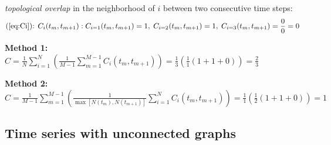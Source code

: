 \documentclass[12pt]{article}
\begin{document}
\emph{topological overlap} in the neighborhood of \(i\) between two consecutive time steps:
\[\text{(\ref{eq:Ci}): } C_{i} (t_m,t_{m+1}): C_{i=1} (t_m,t_{m+1})  = 1, \; C_{i=2} (t_m,t_{m+1}) = 1, \; C_{i=3} (t_m,t_{m+1}) = \frac{0}{0} = 0\]
 
 \begin{flushleft}
 { \bfseries Method 1: }\( C = \frac{1}{N} \sum_{i=1}^N \left( \frac{1}{M-1} \sum_{m=1}^{M-1} C_i(t_m,t_{m+1}) \right) = \frac{1}{3}(\frac{1}{1}(1+1+0)) = \frac{2}{3} \)
 
{ \bfseries Method 2:} \(C = \frac{1}{M-1}\sum_{m=1}^{M-1}  \left( \frac{1}{\max [N(t_m),N(t_{m+1})]} \sum_{i = 1}^{N} C_i(t_m,t_{m+1}) \right) = \frac{1}{1} \left( \frac{1}{2} (1 + 1+ 0) \right) =  1\)
 \end{flushleft}

 

\newpage %
\subsection{Time series with unconnected graphs}
\end{document}
